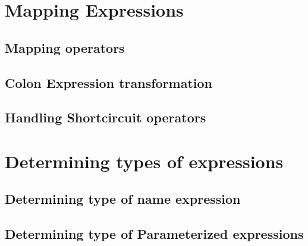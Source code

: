 \section{Mapping Expressions}
\subsection{Mapping operators}
\subsection{Colon Expression transformation}
\subsection{Handling Shortcircuit operators}
\section{Determining types of expressions}
\subsection{Determining type of name expression}
\subsection{Determining type of Parameterized expressions}

